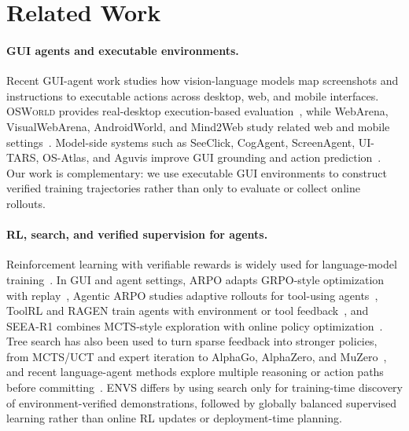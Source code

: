 \documentclass[11pt]{article}
\begin{document}
\section{Related Work}
\paragraph{GUI agents and executable environments.}
Recent GUI-agent work studies how vision-language models map screenshots and instructions to executable actions across desktop, web, and mobile interfaces. \textsc{OSWorld} provides real-desktop execution-based evaluation~\citep{xie2024osworld}, while WebArena, VisualWebArena, AndroidWorld, and Mind2Web study related web and mobile settings~\citep{zhou2023webarena,koh2024visualwebarena,rawles2024androidworld,deng2024mind2web}. Model-side systems such as SeeClick, CogAgent, ScreenAgent, UI-TARS, OS-Atlas, and Aguvis improve GUI grounding and action prediction~\citep{cheng2024seeclick,hong2023cogagent,zhang2024screenagent,qin2025uitars,wu2024osatlas,zhang2025aguvis}. Our work is complementary: we use executable GUI environments to construct verified training trajectories rather than only to evaluate or collect online rollouts.

\paragraph{RL, search, and verified supervision for agents.}
Reinforcement learning with verifiable rewards is widely used for language-model training~\citep{schulman2017ppo,shao2024deepseekmath,deepseek2025r1,yu2025dapo}. In GUI and agent settings, ARPO adapts GRPO-style optimization with replay~\citep{lu2025arpo_gui}, Agentic ARPO studies adaptive rollouts for tool-using agents~\citep{dong2025agentic_arpo}, ToolRL and RAGEN train agents with environment or tool feedback~\citep{qian2025toolrl,wang2025ragen}, and SEEA-R1 combines MCTS-style exploration with online policy optimization~\citep{tian2025seea}. Tree search has also been used to turn sparse feedback into stronger policies, from MCTS/UCT and expert iteration to AlphaGo, AlphaZero, and MuZero~\citep{coulom2006mcts,kocsis2006uct,anthony2017expert,silver2016alphago,silver2017alphazero,schrittwieser2020muzero}, and recent language-agent methods explore multiple reasoning or action paths before committing~\citep{yao2023treeofthoughts,koh2024tree_search_lm_agents,putta2024agentq}. \textsc{ENVS} differs by using search only for training-time discovery of environment-verified demonstrations, followed by globally balanced supervised learning rather than online RL updates or deployment-time planning.
\end{document}

